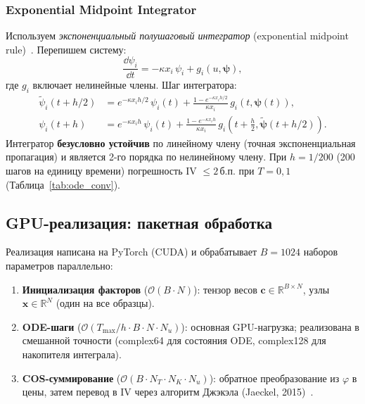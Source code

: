 \subsubsection{Exponential Midpoint Integrator}

Используем \textit{экспоненциальный полушаговый интегратор}
(exponential midpoint rule)~\cite{Hochbruck2010}. Перепишем систему:
\[
  \frac{\dd\psi_i}{\dd t} = -\kappa x_i\,\psi_i + g_i(u, \boldsymbol{\psi}),
\]
где $g_i$ включает нелинейные члены. Шаг интегратора:
\begin{align}
  \tilde{\psi}_i(t+h/2) &= e^{-\kappa x_i h/2}\,\psi_i(t)
    + \frac{1-e^{-\kappa x_i h/2}}{\kappa x_i}\,g_i(t, \boldsymbol{\psi}(t)),
    \label{eq:half_step}\\
  \psi_i(t+h) &= e^{-\kappa x_i h}\,\psi_i(t)
    + \frac{1-e^{-\kappa x_i h}}{\kappa x_i}\,g_i\!\left(t+\tfrac{h}{2},
      \tilde{\boldsymbol{\psi}}(t+h/2)\right).
    \label{eq:full_step}
\end{align}
Интегратор \textbf{безусловно устойчив} по линейному члену (точная экспоненциальная
пропагация) и является 2-го порядка по нелинейному члену.
При $h = 1/200$ (200 шагов на единицу времени) погрешность IV
$\leq 2\,\text{б.п.}$ при $T = 0{,}1$ (Таблица~\ref{tab:ode_conv}).

\subsection{GPU-реализация: пакетная обработка}

Реализация написана на PyTorch (CUDA) и обрабатывает $B = 1024$ наборов
параметров параллельно:

\begin{enumerate}
  \item \textbf{Инициализация факторов} ($\mathcal{O}(B\cdot N)$):
        тензор весов $\mathbf{c} \in \mathbb{R}^{B \times N}$, узлы
        $\mathbf{x} \in \mathbb{R}^N$ (один на все образцы).
  \item \textbf{ODE-шаги} ($\mathcal{O}(T_{\max}/h \cdot B \cdot N \cdot N_u)$):
        основная GPU-нагрузка; реализована в смешанной точности
        (complex64 для состояния ODE, complex128 для накопителя интеграла).
  \item \textbf{COS-суммирование} ($\mathcal{O}(B \cdot N_T \cdot N_K \cdot N_u)$):
        обратное преобразование из $\varphi$ в цены, затем перевод в IV
        через алгоритм Джэкэла (Jaeckel, 2015)~\cite{Jaeckel2015}.
\end{enumerate}

